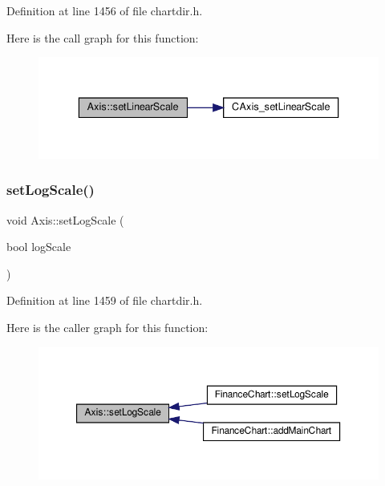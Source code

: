 Definition at line 1456 of file chartdir.\+h.

Here is the call graph for this function\+:
\nopagebreak
\begin{figure}[H]
\begin{center}
\leavevmode
\includegraphics[width=336pt]{class_axis_a1c02cb45cc6f4d01d0b420298ebe668c_cgraph}
\end{center}
\end{figure}
\mbox{\label{class_axis_a3222aeb4e534dbe9c1ffa68cb11a47b8}} 
\subsubsection{\texorpdfstring{set\+Log\+Scale()}{setLogScale()}\hspace{0.1cm}{\footnotesize\ttfamily [1/4]}}
{\footnotesize\ttfamily void Axis\+::set\+Log\+Scale (\begin{DoxyParamCaption}\item[{bool}]{log\+Scale }\end{DoxyParamCaption})\hspace{0.3cm}{\ttfamily [inline]}}



Definition at line 1459 of file chartdir.\+h.

Here is the caller graph for this function\+:
\nopagebreak
\begin{figure}[H]
\begin{center}
\leavevmode
\includegraphics[width=350pt]{class_axis_a3222aeb4e534dbe9c1ffa68cb11a47b8_icgraph}
\end{center}
\end{figure}
\mbox{\label{class_axis_a344d2266d15c80d455e5cc9cd9e8b601}} 
